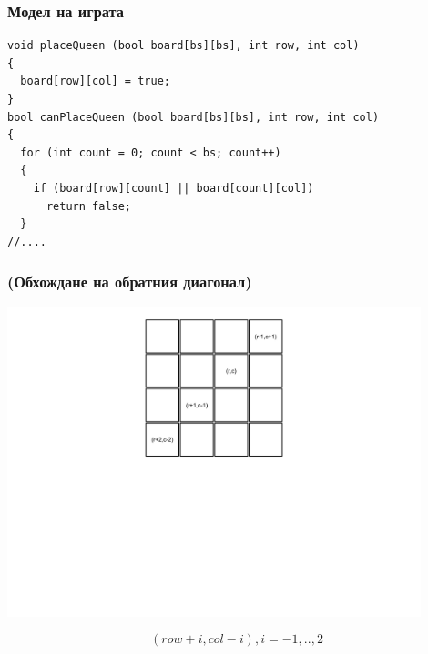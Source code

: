 \documentclass{beamer}
\begin{document}
\begin{frame}[fragile]
\frametitle{Модел на играта}
\begin{lstlisting}
void placeQueen (bool board[bs][bs], int row, int col)
{
  board[row][col] = true;
}
bool canPlaceQueen (bool board[bs][bs], int row, int col)
{
  for (int count = 0; count < bs; count++)
  {
    if (board[row][count] || board[count][col])
      return false;
  }
//....
\end{lstlisting}
\end{frame}



\begin{frame}[fragile]
\frametitle{(Обхождане на обратния диагонал)}
\begin{center}
\includegraphics[width=12cm]{images/cb_count}
\end{center}
\vspace*{-125pt}
\begin{equation*}
(row+i,col-i), i = -1,..,2
\end{equation*}
\end{frame}
\end{document}
